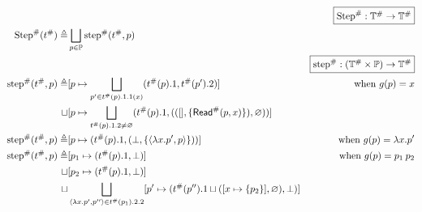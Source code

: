 \documentclass{article}
\begin{document}
\begin{align*}
                                  &                                                                                                                                    & \fbox{$\Abs\Step:\Abs{\mathbb{T}}\rightarrow\Abs{\mathbb{T}}$}                   \\
  \Abs\Step(\Abs{t})   \triangleq & \bigsqcup_{p\in\mathbb{P}}\Abs\step(\Abs{t},p)                                                                                                                                                                        \\
                                  &                                                                                                                                    & \fbox{$\Abs\step:(\Abs{\mathbb{T}}\times\mathbb{P})\rightarrow\Abs{\mathbb{T}}$} \\
  \Abs\step(\Abs{t},p) \triangleq & [p\mapsto\bigsqcup_{p'\in\Abs{t}(p).1.1(x)}(\Abs{t}(p).1,\Abs{t}(p').2)]                                                           & \text{when }g(p)=x                                                               \\
  \sqcup                          & [p\mapsto\bigsqcup_{\Abs{t}(p).1.2\neq\varnothing}(\Abs{t}(p).1,(([],\{\Abs\ReadE(p,x)\}),\varnothing))]                                                                                                              \\
  \Abs\step(\Abs{t},p) \triangleq & [p\mapsto(\Abs{t}(p).1,(\bot,\{\langle\lambda x.p',p\rangle\}))]                                                                   & \text{when }g(p)=\lambda x.p'                                                    \\
  \Abs\step(\Abs{t},p) \triangleq & [p_1\mapsto(\Abs{t}(p).1,\bot)]                                                                                                    & \text{when }g(p)=p_1\:p_2                                                        \\
  \sqcup                          & [p_2\mapsto(\Abs{t}(p).1,\bot)]                                                                                                                                                                                       \\
  \sqcup                          & \bigsqcup_{\langle\lambda x.p',p''\rangle\in\Abs{t}(p_1).2.2}[p'\mapsto(\Abs{t}(p'').1\sqcup([x\mapsto\{p_2\}],\varnothing),\bot)]                                                                                    \\

\end{align*}
\end{document}
